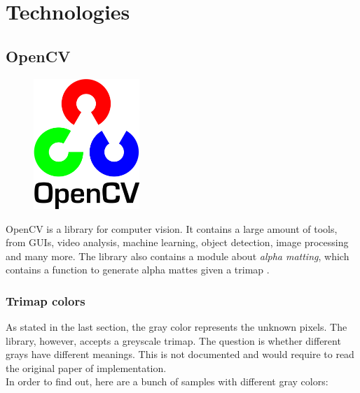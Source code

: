 \documentclass[a4paper]{article}
\begin{document}
\pagebreak

\section{Technologies}

\subsection{OpenCV}

\begin{figure}
    \includegraphics[width=4cm]{opencvlogo.png}
\end{figure}

OpenCV\cite{opencv} is a library
for computer vision. It contains a large
amount of tools, from \gls{GUI}s, video analysis, machine learning,
object detection, image processing and many more\cite{opencvdoc}.
The library also contains a module about \textit{alpha matting},
which contains a function to generate alpha mattes given a \gls{trimap}
\cite{opencvalphamatting}.

\subsubsection{Trimap colors}

As stated in the last section, the gray color represents the unknown pixels.
The library, however, accepts a greyscale \gls{trimap}.
The question is whether different grays have different meanings.
This is not documented and would require to read the original
paper of implementation. \\ %
In order to find out, here are a bunch of samples with different gray
colors:

\wrapfill
\end{document}

